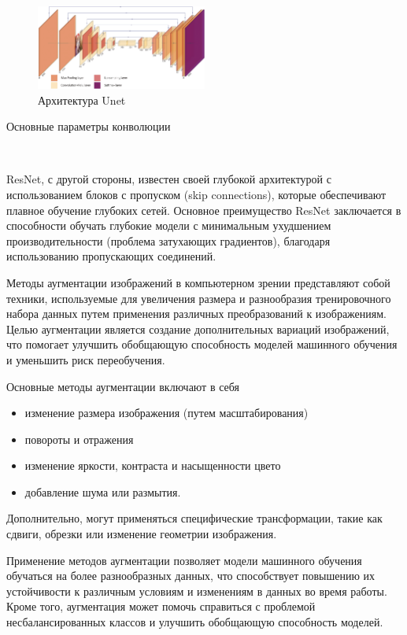 \begin{figure}[h]
    \centering
    \includegraphics[width=0.5\textwidth]{assets/ml/cv/unet.png}
    \caption{Архитектура Unet \cite{ronneberger2015u}}
    \label{unet_arch}
\end{figure}

Основные параметры конволюции \begin{itemize}
    \

\end{itemize}


ResNet, с другой стороны, известен своей глубокой архитектурой с использованием блоков с пропуском (skip connections), которые обеспечивают плавное обучение глубоких сетей. Основное преимущество ResNet заключается в способности обучать глубокие модели с минимальным ухудшением производительности (проблема затухающих градиентов), благодаря использованию пропускающих соединений.



Методы аугментации изображений в компьютерном зрении представляют собой техники, используемые для увеличения размера и разнообразия тренировочного набора данных путем применения различных преобразований к изображениям. 
Целью аугментации является создание дополнительных вариаций изображений, что помогает улучшить обобщающую способность моделей машинного обучения и уменьшить риск переобучения.

Основные методы аугментации включают в себя
\begin{itemize}
    \item изменение размера изображения (путем масштабирования)
    \item  повороты и отражения 
    \item  изменение яркости, контраста и насыщенности цвето
    \item добавление шума или размытия.
\end{itemize}    
    
Дополнительно, могут применяться специфические трансформации, такие как сдвиги, обрезки или изменение геометрии изображения.

Применение методов аугментации позволяет модели машинного обучения обучаться на более разнообразных данных, 
что способствует повышению их устойчивости к различным условиям и изменениям в данных во время работы.
Кроме того, аугментация может помочь справиться с проблемой несбалансированных классов и улучшить обобщающую способность моделей.


